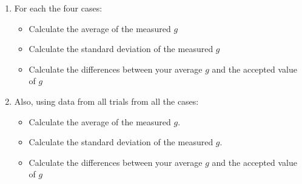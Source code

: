 \begin{enumerate}
\begin{enumerate}
    
  \end{enumerate}





  \item For each the four cases:
\begin{itemize}

  \item Calculate the average of the measured $g$
  \item Calculate the standard deviation of the measured $g$
  \item Calculate the differences between your average $g$ and the accepted value of $g$
\end{itemize} 

  \item Also, using data from all trials from all the cases:
  \begin{itemize}
    \item Calculate the average of the measured $g$.
    \item Calculate the standard deviation of the measured $g$.
    \item Calculate the differences between your average $g$ and the accepted value of $g$
  \end{itemize}

\end{enumerate}

